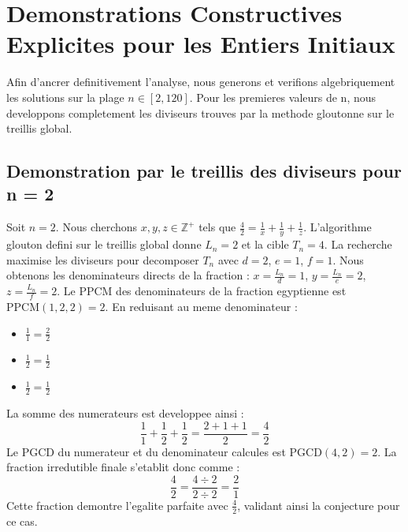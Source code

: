 \documentclass[11pt,a4paper]{article}
\begin{document}
\section{Demonstrations Constructives Explicites pour les Entiers Initiaux}

Afin d'ancrer definitivement l'analyse, nous generons et verifions algebriquement les solutions sur la plage $n \in [2, 120]$. Pour les premieres valeurs de n, nous developpons completement les diviseurs trouves par la methode gloutonne sur le treillis global.

\subsection{Demonstration par le treillis des diviseurs pour n = 2}
Soit $n = 2$. Nous cherchons $x, y, z \in \mathbb{Z}^{+}$ tels que $\frac{4}{2} = \frac{1}{x} + \frac{1}{y} + \frac{1}{z}$.
L'algorithme glouton defini sur le treillis global donne $L_n = 2$ et la cible $T_n = 4$.
La recherche maximise les diviseurs pour decomposer $T_n$ avec $d = 2$, $e = 1$, $f = 1$.
Nous obtenons les denominateurs directs de la fraction : $x = \frac{L_n}{d} = 1$, $y = \frac{L_n}{e} = 2$, $z = \frac{L_n}{f} = 2$.
Le PPCM des denominateurs de la fraction egyptienne est $\text{PPCM}(1, 2, 2) = 2$.
En reduisant au meme denominateur :
\begin{itemize}
    \item $\frac{1}{1} = \frac{2}{2}$
    \item $\frac{1}{2} = \frac{1}{2}$
    \item $\frac{1}{2} = \frac{1}{2}$
\end{itemize}
La somme des numerateurs est developpee ainsi :
$$ \frac{1}{1} + \frac{1}{2} + \frac{1}{2} = \frac{2 + 1 + 1}{2} = \frac{4}{2} $$
Le PGCD du numerateur et du denominateur calcules est $\text{PGCD}(4, 2) = 2$.
La fraction irredutible finale s'etablit donc comme :
$$ \frac{4}{2} = \frac{4 \div 2}{2 \div 2} = \frac{2}{1} $$
Cette fraction demontre l'egalite parfaite avec $\frac{4}{2}$, validant ainsi la conjecture pour ce cas.
\end{document}
